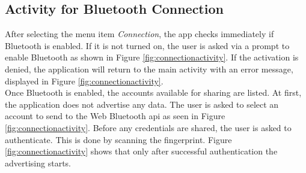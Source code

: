 
\subsection{Activity for Bluetooth Connection}
After selecting the menu item \textit{Connection}, the app checks immediately if Bluetooth is enabled. If it is not turned on, the user is asked via a prompt to enable Bluetooth as shown in Figure \ref{fig:connectionactivity}\protect{}.
If the activation is denied, the application will return to the main activity with an error message, displayed in Figure \ref{fig:connectionactivity}\protect{}. \\
Once Bluetooth is enabled, the accounts available for sharing are listed. At first, the application does not advertise any data. The user is asked to select an account to send to the Web Bluetooth \gls{api} as seen in Figure \ref{fig:connectionactivity}\protect{}. Before any credentials are shared, the user is asked to authenticate. This is done by scanning the fingerprint. Figure \ref{fig:connectionactivity}\protect{} shows that only after successful authentication the advertising starts.

